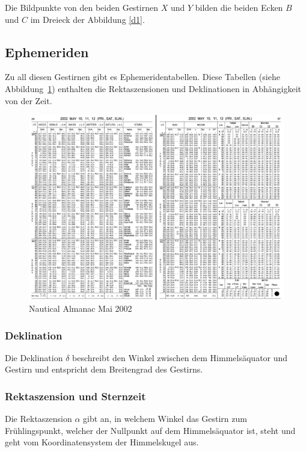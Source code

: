Die Bildpunkte von den beiden Gestirnen $X$ und $Y$ bilden die beiden Ecken $B$ und $C$ im Dreieck der Abbildung \ref{d1}.
\subsection{Ephemeriden}
\label{ephe}
Zu all diesen Gestirnen gibt es Ephemeridentabellen.
%
Diese Tabellen (siehe Abbildung~\ref{nav:fig:eph}) enthalten die
Rektaszensionen und Deklinationen in Abhängigkeit von der Zeit.
\begin{figure}
\centering
	\includegraphics[width=\textwidth]{papers/nav/bilder/ephe.png}
	\caption[Nautical Almanac Mai 2002]{Nautical Almanac Mai 2002}
	\label{nav:fig:eph}
\end{figure}

\subsubsection{Deklination}
%
Die Deklination $\delta$ beschreibt den Winkel zwischen dem Himmelsäquator und Gestirn und entspricht dem Breitengrad des Gestirns.

\subsubsection{Rektaszension und Sternzeit}
%
Die Rektaszension $\alpha$ gibt an, in welchem Winkel das Gestirn
zum Frühlingspunkt, welcher der Nullpunkt auf dem Himmelsäquator
%
ist, steht und geht vom Koordinatensystem der Himmelskugel aus.

